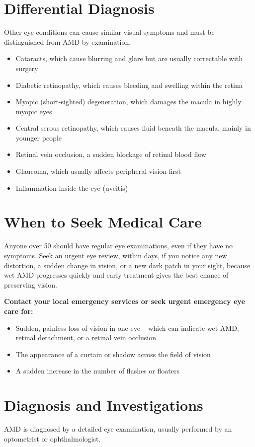 \section*{Differential Diagnosis}
Other eye conditions can cause similar visual symptoms and must be distinguished from AMD by examination.

\begin{itemize}
    \item Cataracts, which cause blurring and glare but are usually correctable with surgery
    \item Diabetic retinopathy, which causes bleeding and swelling within the retina
    \item Myopic (short-sighted) degeneration, which damages the macula in highly myopic eyes
    \item Central serous retinopathy, which causes fluid beneath the macula, mainly in younger people
    \item Retinal vein occlusion, a sudden blockage of retinal blood flow
    \item Glaucoma, which usually affects peripheral vision first
    \item Inflammation inside the eye (uveitis)
\end{itemize}

\section*{When to Seek Medical Care}
Anyone over 50 should have regular eye examinations, even if they have no symptoms. Seek an urgent eye review, within days, if you notice any new distortion, a sudden change in vision, or a new dark patch in your sight, because wet AMD progresses quickly and early treatment gives the best chance of preserving vision.

\textbf{Contact your local emergency services or seek urgent emergency eye care for:}
\begin{itemize}
    \item Sudden, painless loss of vision in one eye -- which can indicate wet AMD, retinal detachment, or a retinal vein occlusion
    \item The appearance of a curtain or shadow across the field of vision
    \item A sudden increase in the number of flashes or floaters
\end{itemize}

\section*{Diagnosis and Investigations}
AMD is diagnosed by a detailed eye examination, usually performed by an optometrist or ophthalmologist.

